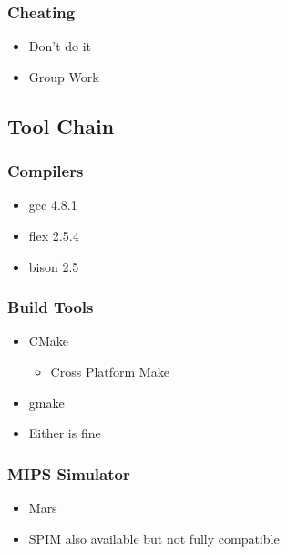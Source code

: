 \documentclass[usepdftitle=false,professionalfonts,compress ]{beamer}
\begin{document}
{
\begin{frame}\frametitle{Cheating}

	\begin{itemize}
	\item Don't do it
			\item Group Work
				\end{itemize}

\end{frame}}




\subsection{Tool Chain}

{
\begin{frame}\frametitle{Compilers}

	\begin{itemize}
	\item gcc 4.8.1
			\item flex 2.5.4
			\item bison 2.5
				\end{itemize}

\end{frame}}





{
\begin{frame}\frametitle{Build Tools}

	\begin{itemize}
	\item CMake

	\begin{itemize}
	\item Cross Platform Make
				\end{itemize}

			\item gmake
			\item Either is fine
				\end{itemize}

\end{frame}}





{
\begin{frame}\frametitle{MIPS Simulator}

	\begin{itemize}
	\item Mars
			\item SPIM also available but not fully compatible
				\end{itemize}

\end{frame}}
\end{document}
